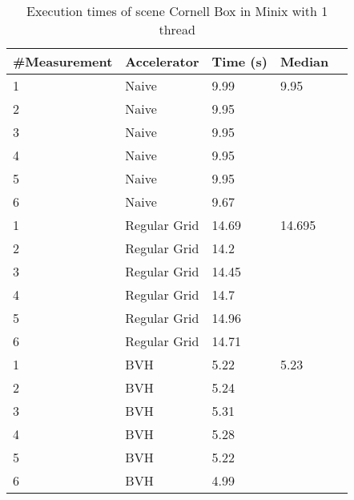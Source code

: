 \begin{table}[H]
	\small
	\begin{tabular}{|l|l|l|l|l|}
		\hline
		\#Measurement & Accelerator & Time (s) & Median \\ \hline
		1 & Naive & 9.99 & 9.95 \\ \hline
		2 & Naive & 9.95 & \\ \hline
		3 & Naive & 9.95 & \\ \hline
		4 & Naive & 9.95 & \\ \hline
		5 & Naive & 9.95 & \\ \hline
		6 & Naive & 9.67 & \\ \hline
		1 & Regular Grid & 14.69 & 14.695 \\ \hline
		2 & Regular Grid & 14.2 & \\ \hline
		3 & Regular Grid & 14.45 & \\ \hline
		4 & Regular Grid & 14.7 & \\ \hline
		5 & Regular Grid & 14.96 & \\ \hline
		6 & Regular Grid & 14.71 & \\ \hline
		1 & BVH & 5.22 & 5.23 \\ \hline
		2 & BVH & 5.24 & \\ \hline
		3 & BVH & 5.31 & \\ \hline
		4 & BVH & 5.28 & \\ \hline
		5 & BVH & 5.22 & \\ \hline
		6 & BVH & 4.99 & \\ \hline
	\end{tabular}
	\label{Time}
	\caption{Execution times of scene Cornell Box in Minix with 1 thread}
\end{table}

